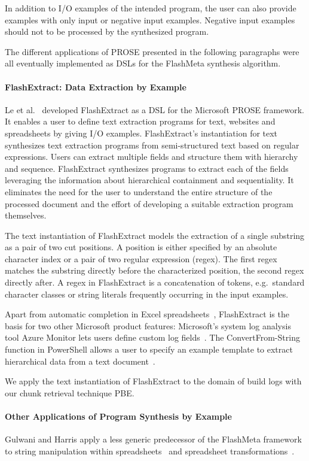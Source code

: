 \documentclass[\myrootdir/main.tex]{subfiles}
\begin{document}
In addition to I/O examples of the intended program, the user can also provide examples with only input or negative input examples.
Negative input examples should not to be processed by the synthesized program.

The different applications of PROSE presented in the following paragraphs were all eventually implemented as DSLs for the FlashMeta synthesis algorithm.

\paragraph{FlashExtract: Data Extraction by Example}
Le et al.~\cite{le2014flashextract:} developed FlashExtract as a DSL for the Microsoft PROSE framework.
It enables a user to define text extraction programs for text, websites and spreadsheets by giving I/O examples.
FlashExtract's instantiation for text synthesizes text extraction programs from semi-structured text based on regular expressions.
Users can extract multiple fields and structure them with hierarchy and sequence.
FlashExtract synthesizes programs to extract each of the fields leveraging the information about hierarchical containment and sequentiality.
It eliminates the need for the user to understand the entire structure of the processed document and the effort of developing a suitable extraction program themselves.

The text instantiation of FlashExtract models the extraction of a single substring as a pair of two cut positions.
A position is either specified by an absolute character index or a pair of two regular expression (regex).
The first regex matches the substring directly before the characterized position, the second regex directly after.
A regex in FlashExtract is a concatenation of tokens, e.g.\ standard character classes or string literals frequently occurring in the input examples.

Apart from automatic completion in Excel spreadsheets~\cite{excel2019flashfill}, FlashExtract is the basis for two other Microsoft product features:
Microsoft's system log analysis tool Azure Monitor lets users define custom log fields~\cite{azure2019custom}.
The ConvertFrom-String function in PowerShell allows a user to specify an example template to extract hierarchical data from a text document~\cite{powershell2019convert}.

We apply the text instantiation of FlashExtract to the domain of build logs with our chunk retrieval technique PBE\@.

\paragraph{Other Applications of Program Synthesis by Example}
Gulwani and Harris apply a less generic predecessor of the FlashMeta framework to string manipulation within spreadsheets~\cite{gulwani2011automating} and spreadsheet transformations~\cite{harris2011spreadsheet}.
\end{document}
